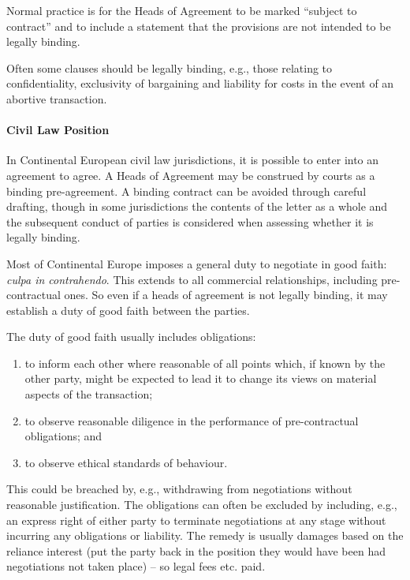 \documentclass[
]{article}
\providecommand{\tightlist}{%
  \setlength{\itemsep}{0pt}\setlength{\parskip}{0pt}}
\begin{document}
Normal practice is for the Heads of Agreement to be marked ``subject to
contract'' and to include a statement that the provisions are not
intended to be legally binding.

Often some clauses should be legally binding, e.g., those relating to
confidentiality, exclusivity of bargaining and liability for costs in
the event of an abortive transaction.

\hypertarget{civil-law-position}{%
\paragraph{Civil Law Position}\label{civil-law-position}}

In Continental European civil law jurisdictions, it is possible to enter
into an agreement to agree. A Heads of Agreement may be construed by
courts as a binding pre-agreement. A binding contract can be avoided
through careful drafting, though in some jurisdictions the contents of
the letter as a whole and the subsequent conduct of parties is
considered when assessing whether it is legally binding.

Most of Continental Europe imposes a general duty to negotiate in good
faith: \emph{culpa in contrahendo}. This extends to all commercial
relationships, including pre-contractual ones. So even if a heads of
agreement is not legally binding, it may establish a duty of good faith
between the parties.

The duty of good faith usually includes obligations:

\begin{enumerate}
\def\labelenumi{\arabic{enumi}.}
\tightlist
\item
  to inform each other where reasonable of all points which, if known by
  the other party, might be expected to lead it to change its views on
  material aspects of the transaction;
\item
  to observe reasonable diligence in the performance of pre-contractual
  obligations; and
\item
  to observe ethical standards of behaviour.
\end{enumerate}

This could be breached by, e.g., withdrawing from negotiations without
reasonable justification. The obligations can often be excluded by
including, e.g., an express right of either party to terminate
negotiations at any stage without incurring any obligations or
liability. The remedy is usually damages based on the reliance interest
(put the party back in the position they would have been had
negotiations not taken place) -- so legal fees etc. paid.
\end{document}
